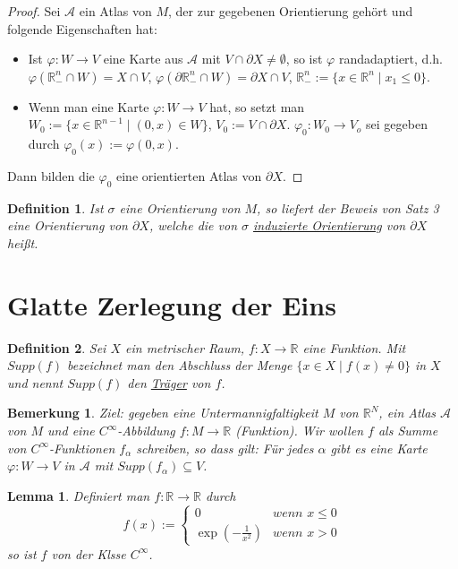 \documentclass[10pt,a4paper]{report}
\newtheorem*{lemma}{Lemma}
\newtheorem*{defi}{Definition}
\newtheorem*{remark}{Bemerkung}
\begin{document}
\begin{proof}
  Sei $\mathscr{A}$ ein Atlas von $M$, der zur gegebenen Orientierung gehört und folgende Eigenschaften hat:
  \begin{itemize}
  \item Ist $\varphi : W \rightarrow V$ eine Karte aus $\mathscr{A}$ mit $V \cap \partial X \ne \emptyset$, so ist $\varphi$ randadaptiert, d.h. $\varphi(\mathbb{R}_{-}^{n} \cap W) = X \cap V$, $\varphi(\partial \mathbb{R}_{-}^{n} \cap W) = \partial X \cap V$, $\mathbb{R}_{-}^{n} := \{ x \in \mathbb{R}^{n} \mid x_{1} \le 0 \}$.
  \item Wenn man eine Karte $\varphi : W \rightarrow V$ hat, so setzt man $W_{0} := \{ x \in \mathbb{R}^{n - 1} \mid (0, x) \in W \}$, $V_{0} := V \cap \partial X$.
    $\varphi_{0} : W_{0} \rightarrow V_{o}$ sei gegeben durch $\varphi_{0}(x) := \varphi(0, x)$.
  \end{itemize}
  Dann bilden die $\varphi_{0}$ eine orientierten Atlas von $\partial X$.
\end{proof}

\begin{defi}
  Ist $\sigma$ eine Orientierung von $M$, so liefert der Beweis von Satz 3 eine Orientierung von $\partial X$, welche die von $\sigma$ \underline{induzierte Orientierung} von $\partial X$ heißt.
\end{defi}

\section{Glatte Zerlegung der Eins}

\begin{defi}
  Sei $X$ ein metrischer Raum, $f : X \rightarrow \mathbb{R}$ eine Funktion.
  Mit $Supp(f)$ bezeichnet man den Abschluss der Menge $\{ x \in X \mid f(x) \ne 0 \}$ in $X$ und nennt $Supp(f)$ den \underline{Träger} von $f$.
\end{defi}

\begin{remark}
  Ziel: gegeben eine Untermannigfaltigkeit $M$ von $\mathbb{R}^{N}$, ein Atlas $\mathscr{A}$ von $M$ und eine $C^{\infty}$-Abbildung $f : M \rightarrow \mathbb{R}$ (Funktion).
  Wir wollen $f$ als Summe von $C^{\infty}$-Funktionen $f_{\alpha}$ schreiben, so dass gilt: Für jedes $\alpha$ gibt es eine Karte $\varphi : W \rightarrow V$ in $\mathscr{A}$ mit $Supp(f_{\alpha}) \subseteq V$.
\end{remark}

\begin{lemma}
  Definiert man $f : \mathbb{R} \rightarrow \mathbb{R}$ durch
  \begin{equation}
    f(x) := \begin{cases}
      0 & \textit{wenn $x \le 0$}\\
      \exp(-\frac{1}{x^{2}}) & \textit{wenn $x > 0$}
    \end{cases}
  \end{equation}
  so ist $f$ von der Klsse $C^{\infty}$.
\end{lemma}
\end{document}
